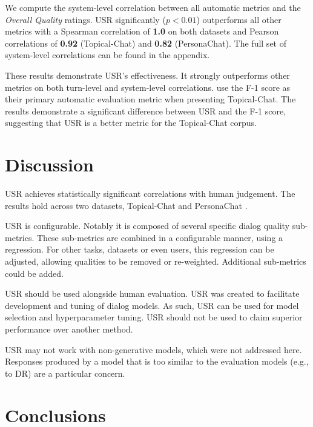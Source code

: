 \documentclass[11pt,a4paper]{article}
\begin{document}
We compute the system-level correlation between all automatic metrics and the \textit{Overall Quality} ratings. USR significantly ($p < 0.01$) outperforms all other metrics with a Spearman correlation of \textbf{1.0} on both datasets and Pearson correlations of \textbf{0.92} (Topical-Chat) and \textbf{0.82} (PersonaChat). The full set of system-level correlations can be found in the appendix.


These results demonstrate USR's effectiveness. It strongly outperforms other metrics on both turn-level and system-level correlations. \citet{gopalakrishnan2019topical} use the F-1 score as their primary automatic evaluation metric when presenting Topical-Chat. The results demonstrate a significant difference between USR and the F-1 score, suggesting that USR is a better metric for the Topical-Chat corpus. 









\section{Discussion}
USR achieves statistically significant correlations with human judgement. The results hold across two datasets, Topical-Chat \citep{gopalakrishnan2019topical} and PersonaChat \citep{zhang2018personalizing}. 

USR is configurable. Notably it is composed of several specific dialog quality sub-metrics. These sub-metrics are combined in a configurable manner, using a regression. For other tasks, datasets or even users, this regression can be adjusted, allowing qualities to be removed or re-weighted. Additional sub-metrics could be added.


USR should be used alongside human evaluation. USR was created to facilitate development and tuning of dialog models. As such, USR can be used for model selection and hyperparameter tuning. USR should not be used to claim superior performance over another method.

USR may not work with non-generative models, which were not addressed here. Responses produced by a model that is too similar to the evaluation models (e.g., to DR) are a particular concern.

\section{Conclusions}
\end{document}
